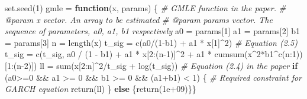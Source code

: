 \documentclass[
  11pt,
]{article}
\newenvironment{Shaded}{\begin{snugshade}}{\end{snugshade}}
\newcommand{\CommentTok}[1]{\textcolor[rgb]{0.56,0.35,0.01}{\textit{#1}}}
\newcommand{\ControlFlowTok}[1]{\textcolor[rgb]{0.13,0.29,0.53}{\textbf{#1}}}
\newcommand{\DecValTok}[1]{\textcolor[rgb]{0.00,0.00,0.81}{#1}}
\newcommand{\FloatTok}[1]{\textcolor[rgb]{0.00,0.00,0.81}{#1}}
\newcommand{\FunctionTok}[1]{\textcolor[rgb]{0.00,0.00,0.00}{#1}}
\newcommand{\NormalTok}[1]{#1}
\newcommand{\OtherTok}[1]{\textcolor[rgb]{0.56,0.35,0.01}{#1}}
\newcommand{\SpecialCharTok}[1]{\textcolor[rgb]{0.00,0.00,0.00}{#1}}
\begin{document}
\begin{Shaded}
\begin{Highlighting}[]
\FunctionTok{set.seed}\NormalTok{(}\DecValTok{1}\NormalTok{)}
\NormalTok{gmle }\OtherTok{=} \ControlFlowTok{function}\NormalTok{(x, params) \{}
  \CommentTok{\#\textquotesingle{} GMLE function in the paper. }
  \CommentTok{\#\textquotesingle{} @param x vector. An array to be estimated}
  \CommentTok{\#\textquotesingle{} @param params vector. The sequence of parameters, a0, a1, b1 respectively}
\NormalTok{  a0 }\OtherTok{=}\NormalTok{ params[}\DecValTok{1}\NormalTok{]}
\NormalTok{  a1 }\OtherTok{=}\NormalTok{ params[}\DecValTok{2}\NormalTok{]}
\NormalTok{  b1 }\OtherTok{=}\NormalTok{ params[}\DecValTok{3}\NormalTok{]}
\NormalTok{  n }\OtherTok{=} \FunctionTok{length}\NormalTok{(x)}
\NormalTok{  t\_sig }\OtherTok{=} \FunctionTok{c}\NormalTok{(a0}\SpecialCharTok{/}\NormalTok{(}\DecValTok{1}\SpecialCharTok{{-}}\NormalTok{b1) }\SpecialCharTok{+}\NormalTok{ a1 }\SpecialCharTok{*}\NormalTok{ x[}\DecValTok{1}\NormalTok{]}\SpecialCharTok{\^{}}\DecValTok{2}\NormalTok{) }\CommentTok{\# Equation (2.5)}
\NormalTok{  t\_sig }\OtherTok{=} \FunctionTok{c}\NormalTok{(t\_sig, a0 }\SpecialCharTok{/}\NormalTok{ (}\DecValTok{1} \SpecialCharTok{{-}}\NormalTok{ b1) }\SpecialCharTok{+}\NormalTok{ a1 }\SpecialCharTok{*}\NormalTok{ x[}\DecValTok{2}\SpecialCharTok{:}\NormalTok{(n}\DecValTok{{-}1}\NormalTok{)]}\SpecialCharTok{\^{}}\DecValTok{2} \SpecialCharTok{+}\NormalTok{ a1 }\SpecialCharTok{*} \FunctionTok{cumsum}\NormalTok{(x}\SpecialCharTok{\^{}}\DecValTok{2}\SpecialCharTok{*}\NormalTok{b1}\SpecialCharTok{\^{}}\FunctionTok{c}\NormalTok{(n}\SpecialCharTok{:}\DecValTok{1}\NormalTok{))[}\DecValTok{1}\SpecialCharTok{:}\NormalTok{(n}\DecValTok{{-}2}\NormalTok{)])}
\NormalTok{  ll }\OtherTok{=} \FunctionTok{sum}\NormalTok{(x[}\DecValTok{2}\SpecialCharTok{:}\NormalTok{n]}\SpecialCharTok{\^{}}\DecValTok{2}\SpecialCharTok{/}\NormalTok{t\_sig }\SpecialCharTok{+} \FunctionTok{log}\NormalTok{(t\_sig)) }\CommentTok{\# Equation (2.4) in the paper}
  \ControlFlowTok{if}\NormalTok{ (a0}\SpecialCharTok{\textgreater{}=}\DecValTok{0} \SpecialCharTok{\&\&}\NormalTok{ a1 }\SpecialCharTok{\textgreater{}=} \DecValTok{0} \SpecialCharTok{\&\&}\NormalTok{ b1 }\SpecialCharTok{\textgreater{}=} \DecValTok{0} \SpecialCharTok{\&\&}\NormalTok{ (a1}\SpecialCharTok{+}\NormalTok{b1) }\SpecialCharTok{\textless{}} \DecValTok{1}\NormalTok{) \{ }\CommentTok{\# Required constraint for GARCH equation}
    \FunctionTok{return}\NormalTok{(ll)}
\NormalTok{  \} }\ControlFlowTok{else}\NormalTok{ \{}\FunctionTok{return}\NormalTok{(}\FloatTok{1e+09}\NormalTok{)\}\}}


\end{Highlighting}
\end{Shaded}
\end{document}
